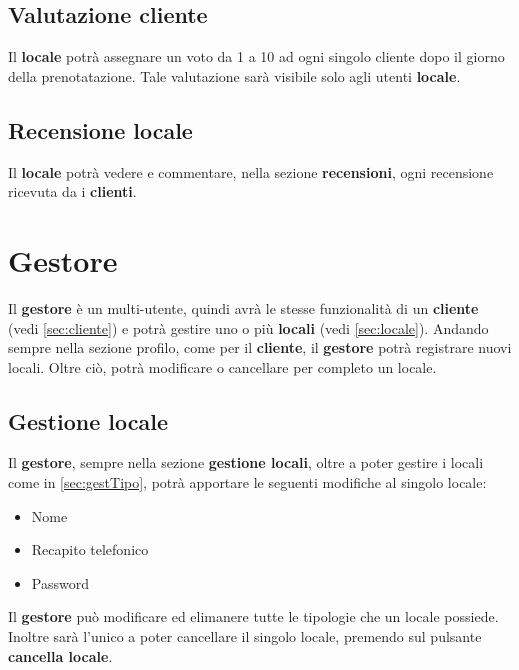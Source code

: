\subsection{Valutazione cliente} \label{sec:valCliente}
Il \textbf{locale} potrà assegnare un voto da 1 a 10 ad ogni singolo cliente dopo il giorno della prenotatazione. Tale valutazione
sarà visibile solo agli utenti \textbf{locale}.

\subsection{Recensione locale} \label{sec:recLocale}
Il \textbf{locale} potrà vedere e commentare, nella sezione \textbf{recensioni}, ogni recensione ricevuta da i
\textbf{clienti}.

\section*{Gestore}
Il \textbf{gestore} è un multi-utente, quindi avrà le stesse funzionalità di un \textbf{cliente} (vedi 
\ref{sec:cliente}) e potrà gestire uno o più \textbf{locali} (vedi \ref{sec:locale}). Andando sempre nella sezione profilo,
come per il \textbf{cliente}, il \textbf{gestore} potrà registrare nuovi locali. Oltre ciò, potrà modificare o
cancellare per completo un locale.

\subsection{Gestione locale} 
Il \textbf{gestore}, sempre nella sezione \textbf{gestione locali}, oltre a poter gestire i locali come in
\ref{sec:gestTipo}, potrà apportare le seguenti modifiche al singolo locale:
\begin{itemize}
    \item Nome
    \item Recapito telefonico
    \item Password
\end{itemize}
Il \textbf{gestore} può modificare ed elimanere tutte le tipologie che un locale possiede. Inoltre sarà l'unico a poter
cancellare il singolo locale, premendo sul pulsante \textbf{cancella locale}.